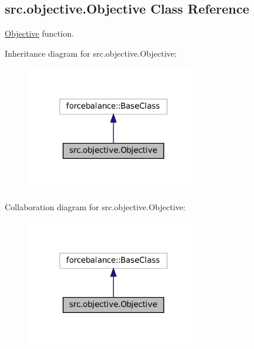 \hypertarget{classsrc_1_1objective_1_1Objective}{}\subsection{src.\+objective.\+Objective Class Reference}
\label{classsrc_1_1objective_1_1Objective}


\hyperlink{classsrc_1_1objective_1_1Objective}{Objective} function.  




Inheritance diagram for src.\+objective.\+Objective\+:
\nopagebreak
\begin{figure}[H]
\begin{center}
\leavevmode
\includegraphics[width=216pt]{classsrc_1_1objective_1_1Objective__inherit__graph}
\end{center}
\end{figure}


Collaboration diagram for src.\+objective.\+Objective\+:
\nopagebreak
\begin{figure}[H]
\begin{center}
\leavevmode
\includegraphics[width=216pt]{classsrc_1_1objective_1_1Objective__coll__graph}
\end{center}
\end{figure}
